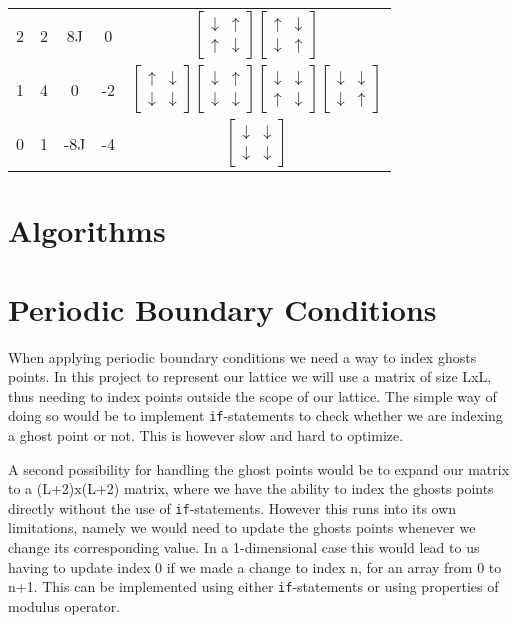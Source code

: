 \documentclass[%
reprint,
nofootinbib,
amsmath,amssymb,
aps,
]{revtex4-1}
\begin{document}
\begin{table}
\begin{tabular}{|c|c|c|c|c|}
	2 & 2 & 8J & 0&$\begin{bmatrix}\downarrow & \uparrow \\ \uparrow&\downarrow\end{bmatrix}\begin{bmatrix}\uparrow & \downarrow \\ \downarrow&\uparrow\end{bmatrix}$\\
	1 & 4 & 0 & -2&$\begin{bmatrix}\uparrow & \downarrow \\ \downarrow&\downarrow\end{bmatrix}\begin{bmatrix}\downarrow & \uparrow \\ \downarrow&\downarrow\end{bmatrix}\begin{bmatrix}\downarrow & \downarrow \\ \uparrow&\downarrow\end{bmatrix}\begin{bmatrix}\downarrow & \downarrow \\ \downarrow&\uparrow\end{bmatrix}$\\
	0 & 1 & -8J & -4&$\begin{bmatrix}\downarrow & \downarrow \\ \downarrow&\downarrow\end{bmatrix}$\\
	\hline
\end{tabular}
\end{table}




\section{Algorithms}%
\section{Periodic Boundary Conditions}
When applying periodic boundary conditions we need a way to index ghosts points. In this project to represent our lattice we will use a matrix of size LxL, thus needing to index points outside the scope of our lattice. The simple way of doing so would be to implement \texttt{if}-statements to check whether we are indexing a ghost point or not. This is however slow and hard to optimize. 

A second possibility for handling the ghost points would be to expand our matrix to a (L+2)x(L+2) matrix, where we have the ability to index the ghosts points directly without the use of \texttt{if}-statements. However this runs into its own limitations, namely we would need to update the ghosts points whenever we change its corresponding value. In a 1-dimensional case this would lead to us having to update index 0 if we made a change to index n, for an array from 0 to n+1. This can be implemented using either \texttt{if}-statements or using properties of modulus operator. 
\end{document}
